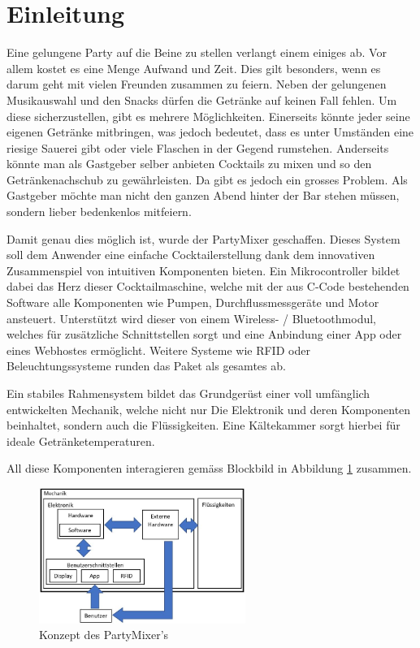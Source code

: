 \clearpage
\section{Einleitung}
\label{sec:Einleitung}

Eine gelungene Party auf die Beine zu stellen verlangt einem einiges ab. Vor allem kostet es eine Menge Aufwand und Zeit. Dies gilt besonders, wenn es darum geht mit vielen Freunden zusammen zu feiern. Neben der gelungenen Musikauswahl und den Snacks dürfen die Getränke auf keinen Fall fehlen. Um diese sicherzustellen, gibt es mehrere Möglichkeiten. Einerseits könnte jeder seine eigenen Getränke mitbringen, was jedoch bedeutet, dass es unter Umständen eine riesige Sauerei gibt oder viele Flaschen in der Gegend rumstehen. Anderseits könnte man als Gastgeber selber anbieten Cocktails zu mixen und so den Getränkenachschub zu gewährleisten. Da gibt es jedoch ein grosses Problem. Als Gastgeber möchte man nicht den ganzen Abend hinter der Bar stehen müssen, sondern lieber bedenkenlos mitfeiern.

Damit genau dies möglich ist, wurde der PartyMixer geschaffen. Dieses System soll dem Anwender eine einfache Cocktailerstellung dank dem innovativen Zusammenspiel von intuitiven Komponenten bieten. Ein Mikrocontroller bildet dabei das Herz dieser Cocktailmaschine, welche mit der aus C-Code bestehenden Software alle Komponenten wie Pumpen, Durchflussmessgeräte und Motor ansteuert. Unterstützt wird dieser von einem Wireless- / Bluetoothmodul, welches für zusätzliche Schnittstellen sorgt und eine Anbindung einer App oder eines Webhostes ermöglicht. Weitere Systeme wie RFID oder Beleuchtungssysteme runden das Paket als gesamtes ab. 

Ein stabiles Rahmensystem bildet das Grundgerüst einer voll umfänglich entwickelten Mechanik, welche nicht nur Die Elektronik und deren Komponenten beinhaltet, sondern auch die Flüssigkeiten. Eine Kältekammer sorgt hierbei für ideale Getränketemperaturen. 

All diese Komponenten interagieren gemäss Blockbild in Abbildung \ref{fig:Konzept_Partymixer} zusammen.


\begin{figure}[h!]
\center
\includegraphics[width = 0.6\textwidth]{graphics/Konzept}
\caption{Konzept des PartyMixer's}
\label{fig:Konzept_Partymixer}
\end{figure}

